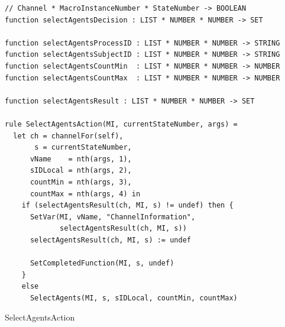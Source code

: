 \begin{listing}[H]
\begin{verbatim}
// Channel * MacroInstanceNumber * StateNumber -> BOOLEAN
function selectAgentsDecision : LIST * NUMBER * NUMBER -> SET

function selectAgentsProcessID : LIST * NUMBER * NUMBER -> STRING
function selectAgentsSubjectID : LIST * NUMBER * NUMBER -> STRING
function selectAgentsCountMin  : LIST * NUMBER * NUMBER -> NUMBER
function selectAgentsCountMax  : LIST * NUMBER * NUMBER -> NUMBER

function selectAgentsResult : LIST * NUMBER * NUMBER -> SET

rule SelectAgentsAction(MI, currentStateNumber, args) =
  let ch = channelFor(self),
       s = currentStateNumber,
      vName    = nth(args, 1),
      sIDLocal = nth(args, 2),
      countMin = nth(args, 3),
      countMax = nth(args, 4) in
    if (selectAgentsResult(ch, MI, s) != undef) then {
      SetVar(MI, vName, "ChannelInformation",
             selectAgentsResult(ch, MI, s))
      selectAgentsResult(ch, MI, s) := undef

      SetCompletedFunction(MI, s, undef)
    }
    else
      SelectAgents(MI, s, sIDLocal, countMin, countMax)
\end{verbatim}
\caption{SelectAgentsAction}
\label{lst:asm:SelectAgentsAction}
\end{listing}





